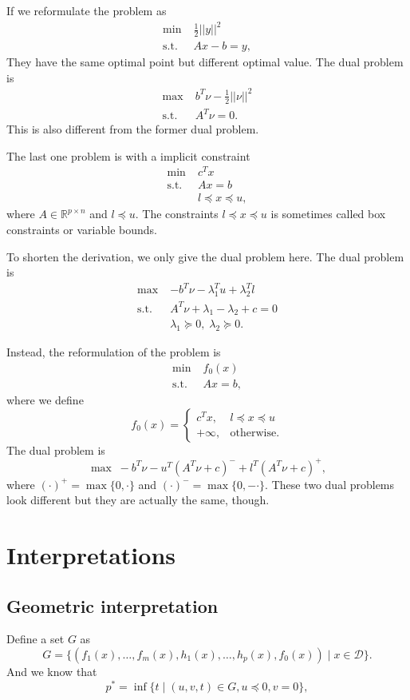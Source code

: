 \documentclass[lang=en,color=blue,mode=fancy,titlestyle=hang]{elegantbook}
\begin{document}
If we reformulate the problem as
\begin{align*}
\min \; &\frac12 ||y||^2\\
\text{s.t.} \; &Ax - b = y,
\end{align*}
They have the same optimal point but different optimal value. The dual problem is
\begin{align*}
\max \; &b^T \nu - \frac12 ||\nu||^2\\
\text{s.t.} \; &A^T \nu = 0.
\end{align*}
This is also different from the former dual problem.

The last one problem is with a implicit constraint
\begin{align*}
\min \; &c^T x\\
\text{s.t.} \; &Ax = b\\
&l \preceq x \preceq u,
\end{align*}
where $A \in \mathbb{R}^{p \times n}$ and $l \preceq u$. The constraints $l \preceq x \preceq u$ is
sometimes called box constraints or variable bounds.

To shorten the derivation, we only give the dual problem here. The dual problem is
\begin{align*}
\max \; &-b^T \nu - \lambda_1^T u + \lambda_2^T l\\
\text{s.t.} \; &A^T \nu + \lambda_1 - \lambda_2 + c = 0\\
&\lambda_1 \succeq 0, \; \lambda_2 \succeq 0.
\end{align*}

Instead, the reformulation of the problem is
\begin{align*}
\min \; &f_0(x)\\
\text{s.t.} \; &Ax = b,
\end{align*}
where we define
\[
f_0(x) = \begin{cases}
c^T x, & l \preceq x \preceq u\\
+ \infty, & \text{otherwise}.
\end{cases}
\]
The dual problem is
\[
\max \; -b^T \nu - u^T (A^T \nu + c)^- + l^T (A^T \nu + c)^+,
\]
where $(\cdot)^+ = \max\{0, \cdot\}$ and $(\cdot)^- = \max\{0, -\cdot\}$. These two dual problems look
different but they are actually the same, though.

\section{Interpretations}
\subsection{Geometric interpretation}
Define a set $G$ as
\[
G = \{ (f_1(x), \ldots, f_m(x), h_1(x), \ldots, h_p(x), f_0(x)) \;|\; x \in \mathcal{D} \}.
\]
And we know that
\[
p^* =  \inf \{ t \;|\; (u, v, t) \in G, u \preceq 0, v = 0\},
\]
\end{document}
